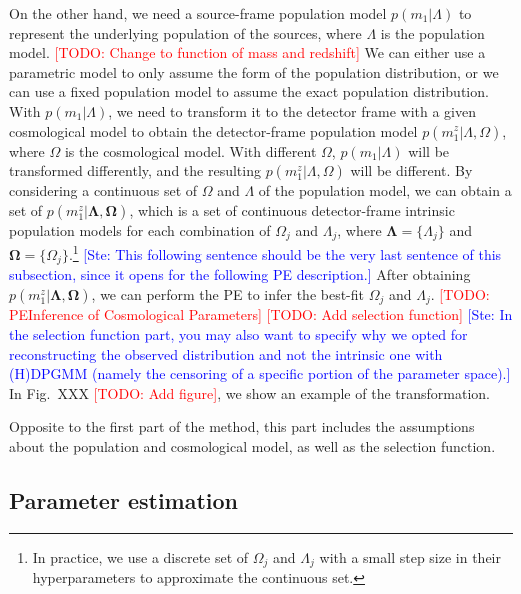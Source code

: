 \documentclass[aps,prd,twocolumn,superscriptaddress,preprintnumbers,nofootinbib,hidelinks]{revtex4-2}
\newcommand{\todo}[1]{\textcolor{red}{[TODO: #1]}}
\newcommand{\ste}[1]{\textcolor{blue}{[Ste: #1]}}
\begin{document}
On the other hand, we need a source-frame population model $p(m_1|\Lambda)$ to represent the underlying population of the sources, where $\Lambda$ is the population model.
\todo{Change to function of mass and redshift}
We can either use a parametric model to only assume the form of the population distribution, or we can use a fixed population model to assume the exact population distribution.
With $p(m_1|\Lambda)$, we need to transform it to the detector frame with a given cosmological model to obtain the detector-frame population model $p(m^z_1|\Lambda, \Omega)$, where $\Omega$ is the cosmological model.
With different $\Omega$, $p(m_1|\Lambda)$ will be transformed differently, and the resulting $p(m^z_1|\Lambda, \Omega)$ will be different.
By considering a continuous set of $\Omega$ and  $\Lambda$ of the population model, we can obtain a set of $p(m^z_1|\mathbf{\Lambda}, \mathbf{\Omega})$, which is a set of continuous detector-frame intrinsic population models for each combination of $\Omega_j$ and $\Lambda_j$, where $\mathbf{\Lambda} = \{\Lambda_j\}$ and $\mathbf{\Omega} = \{\Omega_j\}$.\footnote{In practice, we use a discrete set of $\Omega_j$ and $\Lambda_j$ with a small step size in their hyperparameters to approximate the continuous set.}
\ste{This following sentence should be the very last sentence of this subsection, since it opens for the following PE description.} 
After obtaining $p(m^z_1|\mathbf{\Lambda}, \mathbf{\Omega})$, we can perform the \ac{PE} to infer the best-fit $\Omega_j$ and $\Lambda_j$.
\todo{PE\textrightarrow Inference of Cosmological Parameters}
\todo{Add selection function} \ste{In the selection function part, you may also want to specify why we opted for reconstructing the observed distribution and not the intrinsic one with (H)DPGMM (namely the censoring of a specific portion of the parameter space).}
In Fig.~XXX \todo{Add figure}, we show an example of the transformation.

Opposite to the first part of the method, this part includes the assumptions about the population and cosmological model, as well as the selection function.

\subsection{Parameter estimation}
\label{sec:pe}
\end{document}
